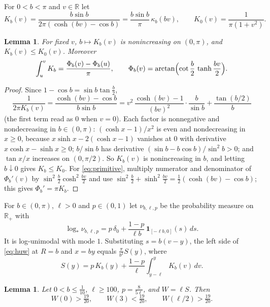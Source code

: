 \documentclass[11pt]{amsart}
\newtheorem{lemma}[theorem]{Lemma}
\theoremstyle{remark}
\newcommand{\R}{\mathbb R}
\newcommand{\Rp}{\R_{+}}
\begin{document}
For $0<b<\pi$ and $v\in\R$ let
\[
K_b(v)=\frac{b\sin b}{2\pi(\cosh(bv)-\cos b)}=\frac{b\sin b}{\pi}\,\kappa_b(bv),\qquad K_0(v)=\frac1{\pi(1+v^2)} .
\]

\begin{lemma}\label{lem:kernel}
For fixed $v$, $b\mapsto K_b(v)$ is nonincreasing on $(0,\pi)$, and $K_b(v)\le K_0(v)$. Moreover
\begin{equation}\label{eq:primitive}
\int_u^vK_b=\frac{\Phi_b(v)-\Phi_b(u)}\pi,\qquad \Phi_b(v)=\arctan\Bigl(\cot\frac b2\,\tanh\frac{bv}2\Bigr).
\end{equation}
\end{lemma}

\begin{proof}
Since $1-\cos b=\sin b\tan\frac b2$,
\[
\frac{1}{2\pi K_b(v)}=\frac{\cosh(bv)-\cos b}{b\sin b}=v^2\,\frac{\cosh(bv)-1}{(bv)^2}\cdot\frac b{\sin b}+\frac{\tan(b/2)}b
\]
(the first term read as $0$ when $v=0$). Each factor is nonnegative and nondecreasing in $b\in(0,\pi)$: $(\cosh x-1)/x^2$ is even and nondecreasing in $x\ge0$, because $x\sinh x-2(\cosh x-1)$ vanishes at $0$ with derivative $x\cosh x-\sinh x\ge0$; $b/\sin b$ has derivative $(\sin b-b\cos b)/\sin^2b>0$; and $\tan x/x$ increases on $(0,\pi/2)$. So $K_b(v)$ is nonincreasing in $b$, and letting $b\downarrow0$ gives $K_b\le K_0$. For \eqref{eq:primitive}, multiply numerator and denominator of $\Phi_b'(v)$ by $\sin^2\frac b2\cosh^2\frac{bv}2$ and use $\sin^2\frac b2+\sinh^2\frac{bv}2=\frac12(\cosh(bv)-\cos b)$; this gives $\Phi_b'=\pi K_b$.
\end{proof}

For $b\in(0,\pi)$, $\ell>0$ and $p\in(0,1)$ let $\nu_{b,\ell,p}$ be the probability measure on $\Rp$ with
\begin{equation}\label{eq:witness0}
\log_*\nu_{b,\ell,p}=p\,\delta_0+\frac{1-p}{\ell b}\,\mathbf 1_{[-\ell b,0]}(s)\,ds .
\end{equation}
It is log-unimodal with mode $1$. Substituting $s=b(v-y)$, the left side of \eqref{eq:huw} at $R=b$ and $x=by$ equals $\frac\pi{b^2}S(y)$, where
\[
S(y)=p\,K_b(y)+\frac{1-p}\ell\int_{y-\ell}^yK_b(v)\,dv .
\]

\begin{lemma}\label{lem:crossing}
Let $0<b\le\frac1{10}$, $\ell\ge100$, $p=\frac8{5\ell}$, and $W=\ell S$. Then
\[
W(0)>\tfrac{19}{20},\qquad W(3)<\tfrac{19}{20},\qquad W(\ell/2)>\tfrac{19}{20}.
\]
\end{lemma}
\end{document}
